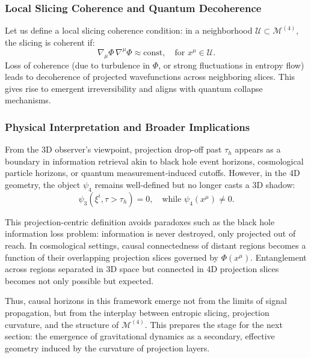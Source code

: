 \documentclass[12pt]{article}
\begin{document}
\subsubsection*{Local Slicing Coherence and Quantum Decoherence}

Let us define a local slicing coherence condition: in a neighborhood $\mathcal{U} \subset \mathcal{M}^{(4)}$, the slicing is coherent if:
\begin{equation}
\label{eq:coherence_condition}
\nabla_\mu \Phi \, \nabla^\mu \Phi \approx \text{const}, \quad \text{for } x^\mu \in \mathcal{U}.
\end{equation}
Loss of coherence (due to turbulence in $\Phi$, or strong fluctuations in entropy flow) leads to decoherence of projected wavefunctions across neighboring slices. This gives rise to emergent irreversibility and aligns with quantum collapse mechanisms.

\subsubsection*{Physical Interpretation and Broader Implications}

From the 3D observer’s viewpoint, projection drop-off past $\tau_h$ appears as a boundary in information retrieval akin to black hole event horizons, cosmological particle horizons, or quantum measurement-induced cutoffs. However, in the 4D geometry, the object $\psi_4$ remains well-defined but no longer casts a 3D shadow:
\begin{equation}
\psi_3(\xi^i, \tau > \tau_h) = 0, \quad \text{while } \psi_4(x^\mu) \neq 0.
\end{equation}

This projection-centric definition avoids paradoxes such as the black hole information loss problem: information is never destroyed, only projected out of reach. In cosmological settings, causal connectedness of distant regions becomes a function of their overlapping projection slices governed by $\Phi(x^\mu)$. Entanglement across regions separated in 3D space but connected in 4D projection slices becomes not only possible but expected.

\bigskip
Thus, causal horizons in this framework emerge not from the limits of signal propagation, but from the interplay between entropic slicing, projection curvature, and the structure of $\mathcal{M}^{(4)}$. This prepares the stage for the next section: the emergence of gravitational dynamics as a secondary, effective geometry induced by the curvature of projection layers.
\end{document}
